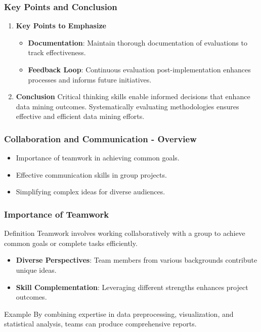 \documentclass{beamer}
\begin{document}
\begin{frame}[fragile]
    \frametitle{Key Points and Conclusion}
    \begin{enumerate}
        \item \textbf{Key Points to Emphasize}
        \begin{itemize}
            \item \textbf{Documentation}: Maintain thorough documentation of evaluations to track effectiveness.
            \item \textbf{Feedback Loop}: Continuous evaluation post-implementation enhances processes and informs future initiatives.
        \end{itemize}
        
        \item \textbf{Conclusion}
        Critical thinking skills enable informed decisions that enhance data mining outcomes. Systematically evaluating methodologies ensures effective and efficient data mining efforts.
    \end{enumerate}
\end{frame}

\begin{frame}[fragile]
    \frametitle{Collaboration and Communication - Overview}
    \begin{itemize}
        \item Importance of teamwork in achieving common goals.
        \item Effective communication skills in group projects.
        \item Simplifying complex ideas for diverse audiences.
    \end{itemize}
\end{frame}

\begin{frame}[fragile]
    \frametitle{Importance of Teamwork}
    \begin{block}{Definition}
        Teamwork involves working collaboratively with a group to achieve common goals or complete tasks efficiently.
    \end{block}
    
    \begin{itemize}
        \item \textbf{Diverse Perspectives}: Team members from various backgrounds contribute unique ideas.
        \item \textbf{Skill Complementation}: Leveraging different strengths enhances project outcomes.
    \end{itemize}

    \begin{block}{Example}
        By combining expertise in data preprocessing, visualization, and statistical analysis, teams can produce comprehensive reports.
    \end{block}
\end{frame}
\end{document}
